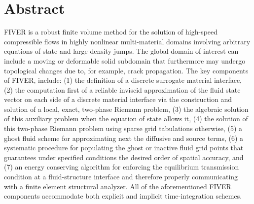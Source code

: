 \documentclass[article, A4, 11pt]{llncs}%
\begin{document}
\section*{Abstract}
FIVER is a robust finite volume method for the solution of high-speed compressible flows in highly nonlinear multi-material domains involving arbitrary equations of state and large density jumps. The global domain of interest can include a moving or deformable solid subdomain that furthermore may undergo topological changes due to, for example, crack propagation. The key components of FIVER, include: (1) the definition of a discrete surrogate material interface, (2) the computation first of a reliable inviscid approximation of the fluid state vector on each side of a discrete material interface via the construction and solution of a local, exact, two-phase Riemann problem, (3) the algebraic solution of this auxiliary problem when the equation of state allows it, (4) the solution of this two-phase Riemann problem using sparse grid tabulations otherwise, (5) a ghost fluid scheme for approximating next the diffusive and source terms, (6) a systematic procedure for populating the ghost or inactive fluid grid points that guarantees under specified conditions the desired order of spatial accuracy, and (7) an energy conserving algorithm for enforcing the equilibrium transmission condition at a fluid-structure interface and therefore properly communicating with a finite element structural analyzer. All of the aforementioned FIVER components accommodate both explicit and implicit time-integration schemes. %
\end{document}
